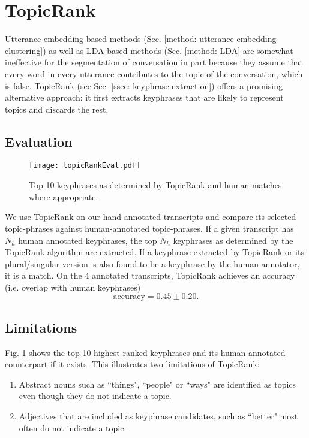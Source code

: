 \section{TopicRank \label{method: topic rank}}

Utterance \gls{embedding} based methods (Sec. \ref{method: utterance embedding clustering}) as well as LDA-based methods (Sec. \ref{method: LDA} are somewhat ineffective for the segmentation of conversation in part because they assume that every word in every \gls{utterance} contributes to the topic of the conversation, which is false.
TopicRank\cite{bougouin-etal-2013-topicrank} (see Sec. \ref{ssec: keyphrase extraction}) offers a promising alternative approach: it first extracts \glspl{keyphrase} that are likely to represent topics and discards the rest.

\subsection{Evaluation}
\begin{figure}
    \centering
    \texttt{[image: topicRankEval.pdf]}
    \caption{Top 10 \glspl{keyphrase} as determined by TopicRank and human matches where appropriate.}
    \label{fig: topicrank eval}
\end{figure}
We use TopicRank on our hand-annotated transcripts and compare its selected topic-phrases against human-annotated topic-phrases. If a given transcript has $N_{h}$ human annotated \glspl{keyphrase}, the top $N_{h}$ \glspl{keyphrase} as determined by the TopicRank algorithm are extracted. If a \gls{keyphrase} extracted by TopicRank or its plural/singular version is also found to be a \gls{keyphrase} by the human annotator, it is a match. On the 4 annotated transcripts, TopicRank achieves an accuracy (i.e. overlap with human \glspl{keyphrase})
\begin{equation}
    \text{accuracy} = 0.45 \pm 0.20.
    \label{eq: topic rank accuracy}
\end{equation}

\subsection{Limitations}
Fig. \ref{fig: topicrank eval} shows the top 10 highest ranked \glspl{keyphrase} and its human annotated counterpart if it exists. This illustrates two limitations of TopicRank:
\begin{enumerate}
    \item Abstract nouns such as ``things", ``people" or ``ways" are identified as topics even though they do not indicate a topic.
    \item Adjectives that are included as \gls{keyphrase} candidates, such as ``better" most often do not indicate a topic.
\end{enumerate}

